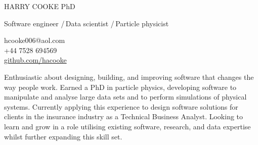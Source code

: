 \documentclass[a4paper]{article}
\newcommand\bodysize{\fontsize{11}{13}}
\newcommand\htwosize{\fontsize{12}{15}}
\newcommand\hlseptwo{{\color{hl}/}\,}
\newcommand\intersectionspacing{0.3em}
\newcommand\sidetitle[2][0em]{%
  \fontfamily{phv}\fontseries{b}\fontsize{12}{13}\selectfont\color{hl}
  \hspace{.1em}
  \rotatebox[origin=c]{90}{\hspace{#1}#2}
}
\newcommand\lefttitleblockvpad{\vspace{.3em}}
\newcommand\lefttitleblock[3]{%
  \colorbox{#1}{%
    \begin{minipage}[c]{.04\textwidth}
      \lefttitleblockvpad
      \sidetitle{#2}
      \lefttitleblockvpad
    \end{minipage}{\color{hl}\vrule width 1pt}%
    \begin{minipage}[c]{.005\textwidth}\hfill\end{minipage}
    \begin{minipage}[c]{.94\textwidth}
      \lefttitleblockvpad
      #3
      \lefttitleblockvpad
    \end{minipage}%
  }
}
\newcommand\cvtitle{HARRY COOKE\xspace}
\newcommand\cvsubtitle{
  Software engineer \hlseptwo Data scientist \hlseptwo Particle physicist
\xspace}
\begin{document}
\pagestyle{pageother}
\thispagestyle{pageone}

\begin{minipage}{\textwidth}
  \begin{minipage}[b]{0.7\textwidth}
    {\fontsize{28}{25}\selectfont\color{hl}%
      \cvtitle 
    }{\fontsize{19}{20}\selectfont%
      \hspace{5pt}PhD
    }\\[.4em]
    {\htwosize\selectfont%
      \cvsubtitle
    }
  \end{minipage}%
  \begin{minipage}[b]{0.3\textwidth}
    \raggedleft{}\bodysize\selectfont%
      hcooke006@aol.com \\[0.1em]
      +44 7528 694569 \\[0.1em]
      \href{https://github.com/hacooke}{github.com/hacooke}
  \end{minipage}
\end{minipage}

\vspace{0.5em}

\lefttitleblock{bg2}{SUMMARY}{%
    \fontseries{m}\fontshape{n}\bodysize\selectfont%
    Enthusiastic about designing, building, and improving software that changes
    the way people work. 
    Earned a PhD in particle physics, developing software to manipulate and
    analyse large data sets and to perform simulations of physical systems.
    Currently applying this experience to design software solutions for clients
    in the insurance industry as a Technical Business Analyst.
    Looking to learn and grow in a role utilising existing software, research,
    and data expertise whilst further expanding this skill set.
}\\[\intersectionspacing]
\end{document}
